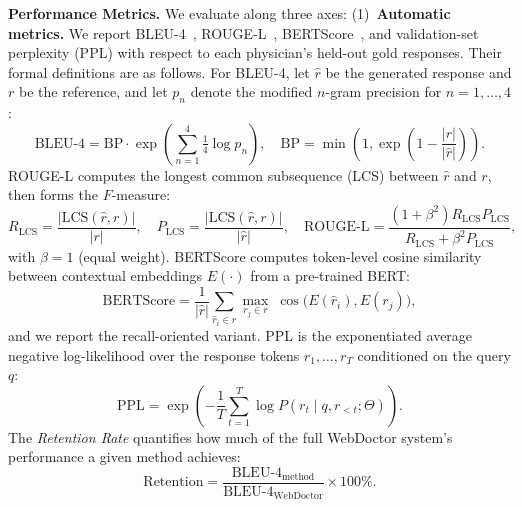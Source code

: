 \textbf{Performance Metrics.}
We evaluate along three axes:
(1)~\textbf{Automatic metrics.} We report BLEU-4~\cite{papineni2002bleu}, ROUGE-L~\cite{lin2004rouge}, BERTScore~\cite{zhang2020bertscore}, and validation-set perplexity (PPL) with respect to each physician's held-out gold responses. Their formal definitions are as follows. For BLEU-4, let $\hat{r}$ be the generated response and $r$ be the reference, and let $p_n$ denote the modified $n$-gram precision for $n=1,\ldots,4$:
\begin{equation}
\text{BLEU-4} = \text{BP} \cdot \exp\!\left(\sum_{n=1}^{4} \tfrac{1}{4} \log p_n\right), \quad \text{BP} = \min\!\left(1, \exp\!\left(1 - \frac{|r|}{|\hat{r}|}\right)\right).
\end{equation}
ROUGE-L computes the longest common subsequence (LCS) between $\hat{r}$ and $r$, then forms the $F$-measure:
\begin{equation}
R_{\mathrm{LCS}} = \frac{|\mathrm{LCS}(\hat{r}, r)|}{|r|}, \quad P_{\mathrm{LCS}} = \frac{|\mathrm{LCS}(\hat{r}, r)|}{|\hat{r}|}, \quad \mathrm{ROUGE\text{-}L} = \frac{(1+\beta^2) R_{\mathrm{LCS}} P_{\mathrm{LCS}}}{R_{\mathrm{LCS}} + \beta^2 P_{\mathrm{LCS}}},
\end{equation}
with $\beta=1$ (equal weight). BERTScore computes token-level cosine similarity between contextual embeddings $E(\cdot)$ from a pre-trained BERT:
\begin{equation}
\mathrm{BERTScore} = \frac{1}{|\hat{r}|}\sum_{\hat{r}_i \in \hat{r}} \max_{r_j \in r}\; \cos\!\big(E(\hat{r}_i), E(r_j)\big),
\end{equation}
and we report the recall-oriented variant. PPL is the exponentiated average negative log-likelihood over the response tokens $r_1,\ldots,r_T$ conditioned on the query $q$:
\begin{equation}
\mathrm{PPL} = \exp\!\left(-\frac{1}{T}\sum_{t=1}^{T} \log P(r_t \mid q, r_{<t}; \Theta)\right).
\end{equation}
The \emph{Retention Rate} quantifies how much of the full WebDoctor system's performance a given method achieves:
\begin{equation}
\mathrm{Retention} = \frac{\mathrm{BLEU\text{-}4}_{\mathrm{method}}}{\mathrm{BLEU\text{-}4}_{\mathrm{WebDoctor}}} \times 100\%.
\end{equation}

